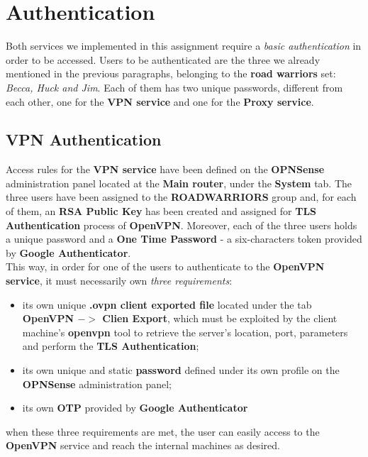 \section{Authentication}
Both services we implemented in this assignment require a \textit{basic authentication} in order to be accessed. Users to be authenticated are the three we already mentioned in the previous paragraphs, belonging to the \textbf{road warriors} set: \textit{Becca, Huck and Jim}. Each of them has two unique passwords, different from each other, one for the \textbf{VPN service} and one for the \textbf{Proxy service}.\\

\subsection{VPN Authentication}
Access rules for the \textbf{VPN service} have been defined on the \textbf{OPNSense} administration panel located at the \textbf{Main router}, under the \textbf{System} tab. The three users have been assigned to the \textbf{ROADWARRIORS} group and, for each of them, an \textbf{RSA Public Key} has been created and assigned for \textbf{TLS Authentication} process of \textbf{OpenVPN}. Moreover, each of the three users holds a unique password and a \textbf{One Time Password} - a six-characters token provided by \textbf{Google Authenticator}.\\
This way, in order for one of the users to authenticate to the \textbf{OpenVPN service}, it must necessarily own \textit{three requirements}:\\
\begin{itemize}
\item its own unique \textbf{.ovpn client exported file} located under the tab \textbf{OpenVPN $->$ Clien Export}, which must be exploited by the client machine's \textbf{openvpn} tool to retrieve the server's location, port, parameters and perform the \textbf{TLS Authentication};
\item its own unique and static \textbf{password} defined under its own profile on the \textbf{OPNSense} administration panel;
\item its own \textbf{OTP} provided by \textbf{Google Authenticator}
\end{itemize}

when these three requirements are met, the user can easily access to the \textbf{OpenVPN} service and reach the internal machines as desired.

